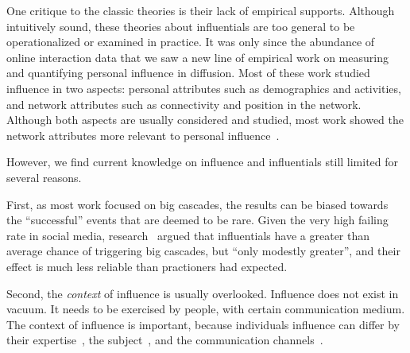 \documentclass[phd,tocprelim]{cornell}
\begin{document}
One critique to the classic theories is their lack of empirical supports. Although intuitively sound, these theories about influentials are too general to be operationalized or examined in practice. It was only since the abundance of online interaction data that we saw a new line of empirical work on measuring and quantifying personal influence in diffusion. Most of these work studied influence in two aspects: personal attributes such as demographics and activities, and network attributes such as connectivity and position in the network.  Although both aspects are usually considered and studied, most work showed the network attributes more relevant to personal influence~\cite{Sun-2009,Bakshy-2011,Kempe-2003,kwak_10,Leskovec-EC-2006,Cha-2009}. 


However, we find current knowledge on influence and influentials still limited for several reasons. 

First, as most work focused on big cascades, the results can be biased towards the ``successful'' events that are deemed to be rare. Given the very high failing rate in social media, research~\cite{Watts-2007,Bakshy-2011} argued that influentials have a greater than average chance of triggering big cascades, but ``only modestly greater'', and their effect is much less reliable than practioners had expected.

Second, the \emph{context} of influence is usually overlooked. Influence does not exist in vacuum. It needs to be exercised by people, with certain communication medium. The context of influence is important, because individuals influence can differ by their expertise~\cite{Cha-2010}, the subject~\cite{Leskovec-EC-2006}, and the communication channels~\cite{Wu-Twitter-2011}.
\end{document}
